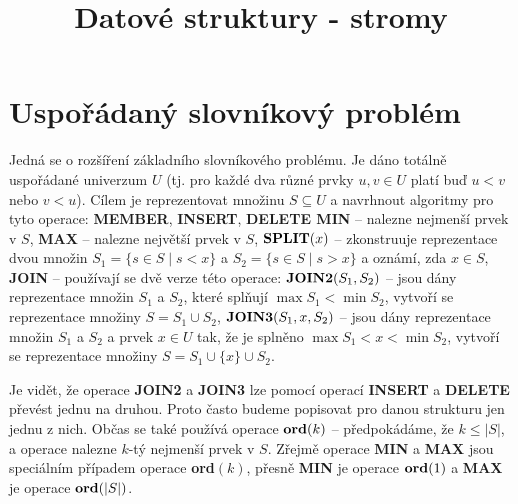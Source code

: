 \documentclass[a4paper,12pt]{article}
\def \emph#1{\underbar{#1}}
\DeclareMathOperator*{\Prob}{Prob}
\begin{document}
     

\newtheorem*{dusledek}{Důsledek}
\newtheorem*{lemma}{Lemma}
\newtheorem*{veta}{Věta}
\newtheorem*{tvrzeni}{Tvrzení}
\newtheorem*{definice}{Definice}

\def \emph#1{\underbar{#1}}
\def \Prob{\operatorname{Prob}}
\def \var{\operatorname{var}}

\title{Datové struktury - stromy}
\date{}
\maketitle

\tableofcontents

\section{Uspořádaný slovníkový problém}

Jedná se o rozšíření základního slovníkového problému. Je 
dáno totálně uspořádané univerzum $U$ (tj. pro každé dva 
různé prvky $u,v\in U$ platí buď $u<v$ nebo $v<
u$). Cílem 
je reprezentovat 
množinu $S\subseteq U$ a navrhnout algoritmy pro tyto operace:\newline 
{\bf MEMBER}, {\bf INSERT}, {\bf DELETE\newline 
MIN} -- nalezne nejmenší prvek v $S$,\newline 
{\bf MAX} -- nalezne největší prvek v $S$,\newline 
$\bold S\bold P\bold L\bold I\bold T(x)$ -- zkonstruuje reprezentace dvou množin 
$S_1=\{s\in S\mid s<x\}$ a $S_2=\{s\in S\mid s>x\}$ a oznámí, zda 
$x\in S$,\newline 
{\bf JOIN} -- používají se dvě verze této operace:\newline 
$\bold J\bold O\bold I\bold N\bold 2(S_1,S_2)$ -- jsou dány reprezentace množin $
S_1$ a $S_2$, které 
splňují $\max S_1<\min S_2$, vytvoří se reprezentace množiny 
$S=S_1\cup S_2$,\newline 
$\bold J\bold O\bold I\bold N\bold 3(S_1,x,S_2)$ -- jsou dány reprezentace množin $
S_1$ a $S_2$ a 
prvek $x\in U$ tak, že je splněno $\max S_1<x<\min S_2$, vytvoří 
se reprezentace množiny $S=S_1\cup \{x\}\cup S_2$.

Je vidět, že operace {\bf JOIN2} a {\bf JOIN3} lze pomocí ope\-rací 
{\bf INSERT} a {\bf DELETE} převést jednu na druhou. Proto často budeme 
popisovat pro danou strukturu jen jednu z nich. 
Občas se také používá operace\newline 
$\bold o\bold r\bold d(k)$ -- předpokádáme, že $k\le |S
|$, a operace nalezne $k$-tý 
nejmenší prvek v $S$.\newline 
Zřejmě operace {\bf MIN} a {\bf MAX} jsou speciálním případem 
ope\-race {\bf ord$(k)$}, 
přesně {\bf MIN} je operace $\bold o\bold r\bold d(1)$ a {\bf MAX} je operace $
\bold o\bold r\bold d(|S|)$.
\end{document}
